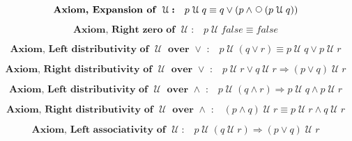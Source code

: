 \documentclass[12pt, fleqn, leqno]{article}
\newcommand{\impl}{\ensuremath{\Rightarrow}}        %
\newcommand{\Until}{\;\mathcal{U}\;}
\newcommand{\Next}{\;\,\text{\raisebox{3.5pt}{\circle{6}}}}
\newcommand{\spacer}{\vspace{-30pt}}
\newcommand{\firstspacer}{\vspace{-26pt}}
\begin{document}
\firstspacer

\begin{equation}\label{E:expansionUntil}
\textbf{Axiom, Expansion of $\Until$:}\quad p \Until q \equiv q \lor (p \land \Next (p \Until q))
\end{equation}

\spacer

\begin{equation}\label{E:untilFalse}
\textbf{Axiom, Right zero of $\Until$:}\quad p \Until false \equiv false
\end{equation}

\spacer

\begin{equation}\label{E:untilOrEquiv}
\textbf{Axiom, Left distributivity of $\Until$ over $\lor$ :}\quad p \Until (q \lor r) \equiv p \Until q \lor p \Until r
\end{equation}

\spacer

\begin{equation}\label{E:untilOrImp}
\textbf{Axiom, Right distributivity of $\Until$ over $\lor$ :}\quad p \Until r \lor q \Until r \impl (p \lor q) \Until r
\end{equation}

\spacer

\begin{equation}\label{E:untilAndImp}
\textbf{Axiom, Left distributivity of $\Until$ over $\land$ :}\quad p \Until (q \land r) \impl p \Until q \land p \Until r
\end{equation}

\spacer

\begin{equation}\label{E:untilAndEquiv}
\textbf{Axiom, Right distributivity of $\Until$ over $\land$ :}\quad (p \land q) \Until r \equiv p \Until r \land q \Until r
\end{equation}

\spacer

\begin{equation}\label{E:leftAssocUntil}
\textbf{Axiom, Left associativity of $\Until$:}\quad p \Until (q \Until r) \impl (p\lor q) \Until r
\end{equation}
\end{document}
